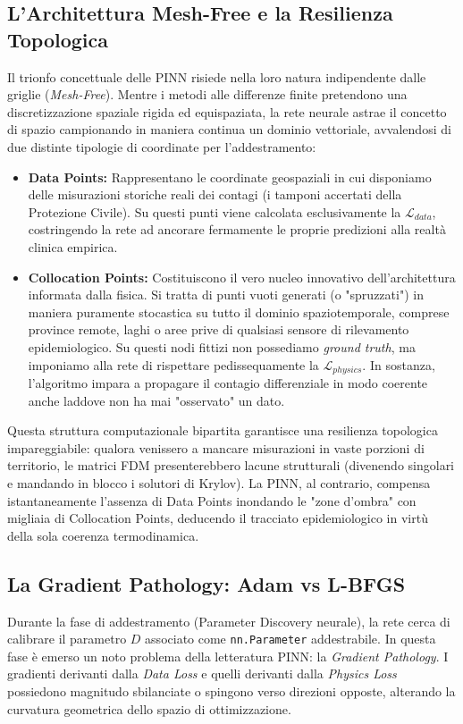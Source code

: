 \documentclass[12pt,a4paper]{article}
\begin{document}
\subsection{L'Architettura Mesh-Free e la Resilienza Topologica}
Il trionfo concettuale delle PINN risiede nella loro natura indipendente dalle griglie (\textit{Mesh-Free}). Mentre i metodi alle differenze finite pretendono una discretizzazione spaziale rigida ed equispaziata, la rete neurale astrae il concetto di spazio campionando in maniera continua un dominio vettoriale, avvalendosi di due distinte tipologie di coordinate per l'addestramento:
\begin{itemize}
    \item \textbf{Data Points:} Rappresentano le coordinate geospaziali in cui disponiamo delle misurazioni storiche reali dei contagi (i tamponi accertati della Protezione Civile). Su questi punti viene calcolata esclusivamente la $\mathcal{L}_{data}$, costringendo la rete ad ancorare fermamente le proprie predizioni alla realtà clinica empirica.
    \item \textbf{Collocation Points:} Costituiscono il vero nucleo innovativo dell'architettura informata dalla fisica. Si tratta di punti vuoti generati (o "spruzzati") in maniera puramente stocastica su tutto il dominio spaziotemporale, comprese province remote, laghi o aree prive di qualsiasi sensore di rilevamento epidemiologico. Su questi nodi fittizi non possediamo \textit{ground truth}, ma imponiamo alla rete di rispettare pedissequamente la $\mathcal{L}_{physics}$. In sostanza, l'algoritmo impara a propagare il contagio differenziale in modo coerente anche laddove non ha mai "osservato" un dato.
\end{itemize}
Questa struttura computazionale bipartita garantisce una resilienza topologica impareggiabile: qualora venissero a mancare misurazioni in vaste porzioni di territorio, le matrici FDM presenterebbero lacune strutturali (divenendo singolari e mandando in blocco i solutori di Krylov). La PINN, al contrario, compensa istantaneamente l'assenza di Data Points inondando le "zone d'ombra" con migliaia di Collocation Points, deducendo il tracciato epidemiologico in virtù della sola coerenza termodinamica.


\subsection{La Gradient Pathology: Adam vs L-BFGS}
Durante la fase di addestramento (Parameter Discovery neurale), la rete cerca di calibrare il parametro $D$ associato come \texttt{nn.Parameter} addestrabile. In questa fase è emerso un noto problema della letteratura PINN: la \textit{Gradient Pathology}.
I gradienti derivanti dalla \textit{Data Loss} e quelli derivanti dalla \textit{Physics Loss} possiedono magnitudo sbilanciate o spingono verso direzioni opposte, alterando la curvatura geometrica dello spazio di ottimizzazione.
\end{document}
